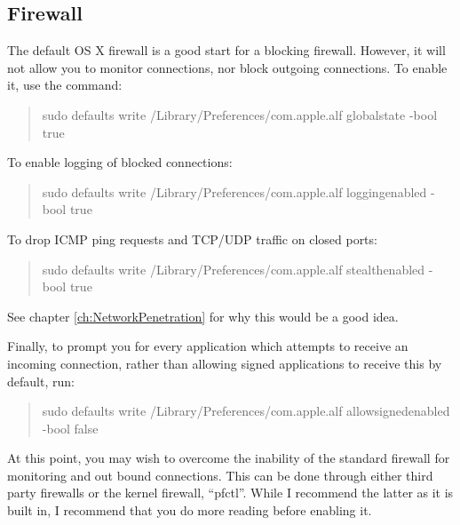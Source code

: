 \documentclass[a4paper,11pt]{report}
\begin{document}
		\subsection{Firewall}
			The default OS X firewall is a good start for a blocking firewall. 
			However, it will not allow you to monitor connections, nor block outgoing connections.
			To enable it, use the command:
			\begin{quote}
				sudo defaults write /Library/Preferences/com.apple.alf globalstate -bool true
			\end{quote}
			To enable logging of blocked connections:
			\begin{quote}
				sudo defaults write /Library/Preferences/com.apple.alf loggingenabled -bool true
			\end{quote}
			To drop ICMP ping requests and TCP/UDP traffic on closed ports:
			\begin{quote}
				sudo defaults write /Library/Preferences/com.apple.alf stealthenabled -bool true
			\end{quote}
			See chapter \ref{ch:NetworkPenetration} for why this would be a good idea. 

			Finally, to prompt you for every application which attempts to receive an incoming connection, rather than allowing signed applications to receive this by default, run:
			\begin{quote}
				sudo defaults write /Library/Preferences/com.apple.alf allowsignedenabled -bool false
			\end{quote}

			At this point, you may wish to overcome the inability of the standard firewall for monitoring and out bound connections. 
			This can be done through either third party firewalls or the kernel firewall, ``pfctl''. 
			While I recommend the latter as it is built in, I recommend that you do more reading before enabling it. 
\end{document}
